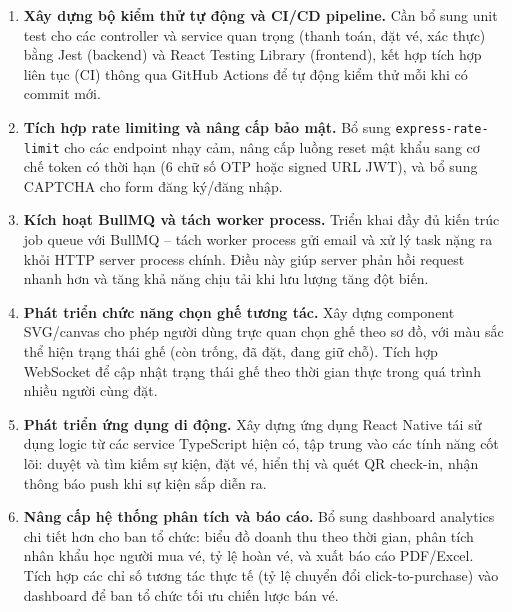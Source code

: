 \begin{enumerate}[leftmargin=*, label=\textbf{\arabic*.}]

    \item \textbf{Xây dựng bộ kiểm thử tự động và CI/CD pipeline.}
    Cần bổ sung unit test cho các controller và service quan trọng
    (thanh toán, đặt vé, xác thực) bằng Jest (backend) và React Testing
    Library (frontend), kết hợp tích hợp liên tục (CI) thông qua
    GitHub Actions để tự động kiểm thử mỗi khi có commit mới.

    \item \textbf{Tích hợp rate limiting và nâng cấp bảo mật.}
    Bổ sung \texttt{express-rate-limit} cho các endpoint nhạy cảm, nâng
    cấp luồng reset mật khẩu sang cơ chế token có thời hạn (6 chữ số
    OTP hoặc signed URL JWT), và bổ sung CAPTCHA cho form đăng ký/đăng
    nhập.

    \item \textbf{Kích hoạt BullMQ và tách worker process.}
    Triển khai đầy đủ kiến trúc job queue với BullMQ -- tách worker
    process gửi email và xử lý task nặng ra khỏi HTTP server process
    chính. Điều này giúp server phản hồi request nhanh hơn và tăng
    khả năng chịu tải khi lưu lượng tăng đột biến.

    \item \textbf{Phát triển chức năng chọn ghế tương tác.}
    Xây dựng component SVG/canvas cho phép người dùng trực quan chọn
    ghế theo sơ đồ, với màu sắc thể hiện trạng thái ghế (còn trống,
    đã đặt, đang giữ chỗ). Tích hợp WebSocket để cập nhật trạng thái
    ghế theo thời gian thực trong quá trình nhiều người cùng đặt.


    \item \textbf{Phát triển ứng dụng di động.}
    Xây dựng ứng dụng React Native tái sử dụng logic từ các service
    TypeScript hiện có, tập trung vào các tính năng cốt lõi: duyệt và
    tìm kiếm sự kiện, đặt vé, hiển thị và quét QR check-in, nhận
    thông báo push khi sự kiện sắp diễn ra.

    \item \textbf{Nâng cấp hệ thống phân tích và báo cáo.}
    Bổ sung dashboard analytics chi tiết hơn cho ban tổ chức: biểu đồ
    doanh thu theo thời gian, phân tích nhân khẩu học người mua vé,
    tỷ lệ hoàn vé, và xuất báo cáo PDF/Excel. Tích hợp các chỉ số
    tương tác thực tế (tỷ lệ chuyển đổi click-to-purchase) vào
    dashboard để ban tổ chức tối ưu chiến lược bán vé.


\end{enumerate}
